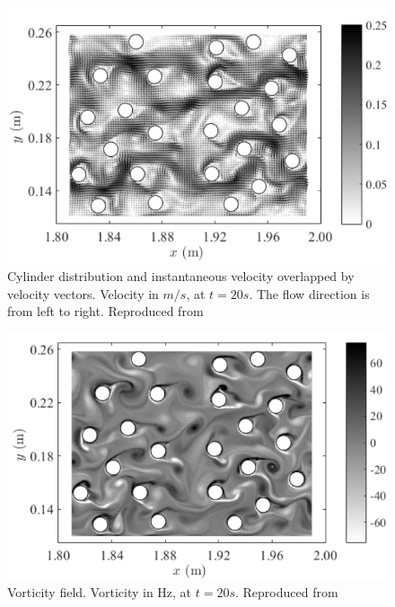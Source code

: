  \begin{figure}[H]
    \centering
    \includegraphics{Figures/research_papers/Canelas2016-vel-field.png}
    \caption{Cylinder distribution and instantaneous velocity overlapped by velocity vectors. Velocity in $m/s$, at $t=20s$. The flow direction is from left to right. Reproduced from \cite{Canelas2016}}
    \label{fig:Canelas2016-vel-field}
\end{figure}
\begin{figure}[H]
    \centering
    \includegraphics{Figures/research_papers/Canelas2016-vorticity-field.png}
    \caption{Vorticity field. Vorticity in Hz, at $t = 20s$. Reproduced from \cite{Canelas2016}}
    \label{fig:Canelas2016-vorticity-field}
\end{figure}
